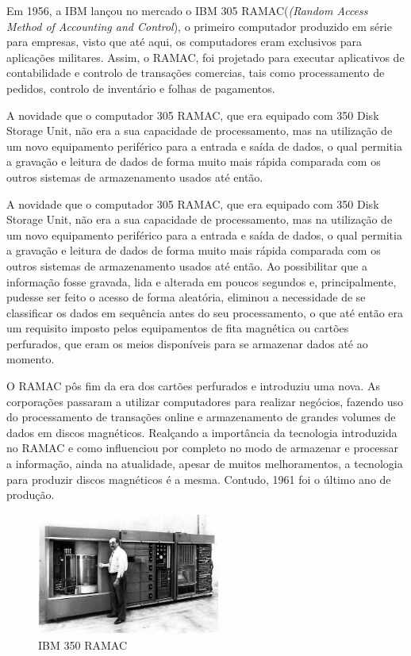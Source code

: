 \documentclass{report}
\begin{document}
		Em 1956, a IBM lançou no mercado o IBM 305 RAMAC(\textit{(Random Access Method of Accounting and Control}), o primeiro computador produzido em série para empresas, visto que até aqui, os computadores eram exclusivos para aplicações militares. Assim, o RAMAC, foi projetado para executar aplicativos de contabilidade e controlo de transações comercias, tais como processamento de pedidos, controlo de inventário e folhas de pagamentos.
\vspace{1mm}

		A novidade que o computador 305 RAMAC, que era equipado com 350 Disk Storage Unit, não era a sua capacidade de processamento, mas na utilização de um novo equipamento periférico para a entrada e saída de dados, o qual permitia a gravação e leitura de dados de forma muito mais rápida comparada com os outros sistemas de armazenamento usados até então.
\vspace{1mm}
		
		A novidade que o computador 305 RAMAC, que era equipado com 350 Disk Storage Unit, não era a sua capacidade de processamento, mas na utilização de um novo equipamento periférico para a entrada e saída de dados, o qual permitia a gravação e leitura de dados de forma muito mais rápida comparada com os outros sistemas de armazenamento usados até então. Ao possibilitar que a informação fosse gravada, lida e alterada em poucos segundos e, principalmente, pudesse ser feito o acesso de forma aleatória, eliminou a necessidade de se classificar os dados em sequência antes do seu processamento, o que até então era um requisito imposto pelos equipamentos de fita magnética ou cartões perfurados, que eram os meios disponíveis para se armazenar dados até ao momento.
\vspace{1mm}

		 O RAMAC pôs fim da era dos cartões perfurados e introduziu uma nova. As corporações passaram a utilizar computadores para realizar negócios, fazendo uso do processamento de transações online e armazenamento de grandes volumes de dados em discos magnéticos. Realçando a importância da tecnologia introduzida no RAMAC e como influenciou por completo no modo de armazenar e processar a informação, ainda na atualidade, apesar de muitos melhoramentos, a tecnologia para produzir discos magnéticos é a mesma. Contudo, 1961 foi o último ano de produção.

	\begin{figure} [h]
		\centering
		\includegraphics[width=6cm, height=4cm]{RAMAC.jpg}
		\caption{IBM 350 RAMAC}
	\end{figure}
	
\end{document}
